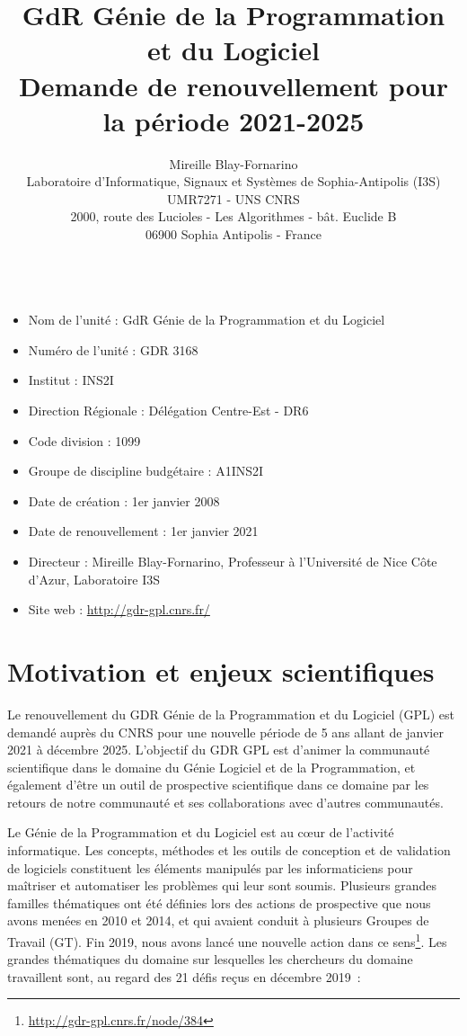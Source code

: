 \documentclass[11pt]{article}
\title{GdR Génie de la Programmation et du Logiciel\\ Demande de renouvellement pour la période 2021-2025}
\author{Mireille Blay-Fornarino\\
Laboratoire d'Informatique, Signaux et Systèmes de Sophia-Antipolis (I3S)\\ 
UMR7271 - UNS CNRS\\
2000, route des Lucioles - Les Algorithmes - bât. Euclide B\\
06900 Sophia Antipolis - France\\
\\
}
\begin{document}
\maketitle



\begin{itemize}
\item Nom de l'unité : GdR Génie de la Programmation et du Logiciel
\item Numéro de l'unité : GDR 3168
\item Institut : INS2I
\item Direction Régionale : Délégation Centre-Est - DR6
\item Code division : 1099
\item Groupe de discipline budgétaire : A1INS2I
\item Date de création : 1er janvier 2008
\item Date de renouvellement : 1er janvier 2021
\item Directeur : Mireille Blay-Fornarino, Professeur à l'Université de Nice Côte d'Azur, Laboratoire I3S
\item Site web : \url{http://gdr-gpl.cnrs.fr/}
\end{itemize}

\section{Motivation et enjeux scientifiques}

Le renouvellement du GDR Génie de la Programmation et du Logiciel (GPL) est
demandé auprès du CNRS pour une nouvelle période de 5 ans allant de janvier
2021 à décembre 2025.
L'objectif du GDR GPL est d'animer la communauté scientifique dans
le domaine du Génie Logiciel et de la Programmation, et également d'être un outil de prospective scientifique dans ce domaine par les retours de notre communauté et ses collaborations avec d'autres communautés.






Le Génie de la Programmation et du Logiciel est au c{\oe}ur de l'activité
informatique. Les concepts, méthodes et les outils de conception et de
validation de logiciels constituent les éléments manipulés par les
informaticiens pour maîtriser et automatiser les problèmes qui leur sont
soumis. 
Plusieurs grandes familles thématiques ont été définies lors des actions de prospective que nous avons menées en 2010 et 2014, et qui avaient conduit à plusieurs Groupes de Travail (GT). 
Fin 2019, nous avons lancé une nouvelle action dans ce sens\footnote{\url{http://gdr-gpl.cnrs.fr/node/384}}. %
\newpage
Les grandes thématiques du domaine sur lesquelles les chercheurs du
domaine travaillent sont, au regard des 21 défis reçus en décembre 2019~: 
\end{document}
